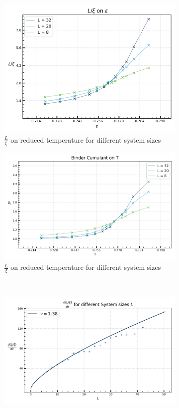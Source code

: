 	\begin{figure}[ht]
		\begin{subfigure}{0.5\textwidth}
			\centering
			\includegraphics[width=0.8\linewidth]{graphics/L_xi.png}
			\caption{$\frac{L}{\xi}$ on reduced temperature for different system sizes}
		\end{subfigure}
		\begin{subfigure}{0.5\textwidth}
			\centering
			\includegraphics[width=0.8\linewidth]{graphics/cum2.png}
			\caption{$\frac{L}{\xi}$ on reduced temperature for different system sizes}
		\end{subfigure} \\
		\begin{subfigure}{0.5\textwidth}
			\centering
			\includegraphics[width=0.8\linewidth]{graphics/critical exponent L_xi.png}

\end{subfigure}
\end{figure}

